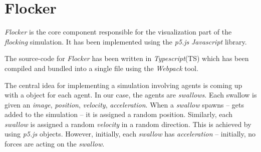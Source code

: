 \documentclass[../main]{subfiles}
\begin{document}
\section{Flocker}

 {\em Flocker} is the core component responsible for the visualization part of the {\em flocking} simulation. 
 It has been implemented using the {\em p5.js}\cite{p5js} {\em Javascript} library. 
 
 The source-code for {\em Flocker} has been written in {\em Typescript}(TS) which has been compiled and bundled into a single  file using the {\em Webpack} tool.

 The central idea for implementing a simulation involving agents is coming up with a object for each agent. In our case, the agents are {\em swallows}. Each swallow is given an {\em image}, {\em position}, {\em velocity}, {\em acceleration}. When a {\em swallow} spawns -- gets added to the simulation -- it is assigned a random position. Similarly, each {\em swallow} is assigned a random {\em velocity} in a random direction. This is achieved by using {\em p5.js}  objects. However, initially, each {\em swallow} has  {\em acceleration} -- initially, no forces are acting on the {\em swallow}.
 
\end{document}
